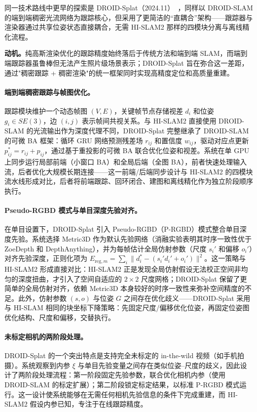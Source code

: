 同一技术路线中更早的探索是 DROID-Splat（2024.11）~\cite{2411_17660}，同样以 DROID-SLAM 的端到端稠密光流网络为跟踪核心，但采用了更简洁的``直耦合''架构——跟踪器与渲染器通过共享位姿状态直接耦合，无需 HI-SLAM2 那样的四模块分离与离线精化流程。

\textbf{动机。}纯高斯渲染优化的跟踪精度始终落后于传统方法和端到端 SLAM，而端到端跟踪器虽鲁棒但无法产生照片级场景表示；DROID-Splat 旨在弥合这一差距，通过"稠密跟踪 + 稠密渲染"的统一框架同时实现高精度定位和高质量重建。

\paragraph{端到端稠密跟踪与帧图优化。}
跟踪模块维护一个动态帧图 $(V, E)$，关键帧节点存储视差 $d_i$ 和位姿 $g_i \in SE(3)$，边 $(i,j)$ 表示帧间共视关系。与 HI-SLAM2 直接使用 DROID-SLAM 的光流输出作为深度代理不同，DROID-Splat 完整继承了 DROID-SLAM 的可微 BA 框架：循环 GRU 网络预测残差场 $r_{ij}$ 和置信度 $w_{ij}$，驱动对应点更新 $p_{ij}^* = r_{ij} + p_{ij}$，通过基于重投影的可微 BA 联合优化位姿和视差。系统在单 GPU 上同步运行局部前端（小窗口 BA）和全局后端（全图 BA），前者快速处理输入流，后者优化大规模长期连接——这一前端/后端同步设计与 HI-SLAM2 的四模块流水线形成对比，后者将前端跟踪、回环闭合、建图和离线精化作为独立阶段顺序执行。

\paragraph{Pseudo-RGBD 模式与单目深度先验对齐。}
在单目设置下，DROID-Splat 引入 Pseudo-RGBD（P-RGBD）模式整合单目深度先验。系统选择 Metric3D 作为默认先验网络（消融实验表明其时序一致性优于 ZoeDepth 和 DepthAnything），并为每帧估计全局仿射参数（尺度 $s_i'$ 和偏移 $o_i'$）对齐先验深度，正则化项为 $E_{\mathrm{reg},m} = \sum_i \| d_i^* - (s_i' d_i' + o_i') \|^2$。这一策略与 HI-SLAM2 形成直接对比：HI-SLAM2 正是发现全局仿射假设无法校正空间非均匀的深度扭曲，才引入了空间自适应的 $2{\times}2$ 尺度网格；DROID-Splat 保留了更简单的全局仿射对齐，依赖 Metric3D 本身较好的时序一致性来弥补空间精度的不足。此外，仿射参数 $(s, o)$ 与位姿 $G$ 之间存在优化歧义——DROID-Splat 采用与 HI-SLAM 相同的块坐标下降策略：先固定尺度/偏移优化位姿，再固定位姿图优化结构、尺度和偏移，交替执行。

\paragraph{未标定相机的两阶段处理。}
DROID-Splat 的一个突出特点是支持完全未标定的 in-the-wild 视频（如手机拍摄）。系统观察到内参 $\xi$ 与单目先验变量之间存在类似位姿--尺度的歧义，因此设计了两阶段处理流程：第一阶段固定先验参数，联合优化相机内参（使用 DROID-SLAM 的标定扩展）；第二阶段锁定标定结果，以标准 P-RGBD 模式运行。这一设计使系统能够在无需任何相机先验信息的条件下完成重建，而 HI-SLAM2 假设内参已知，专注于在线跟踪精度。

